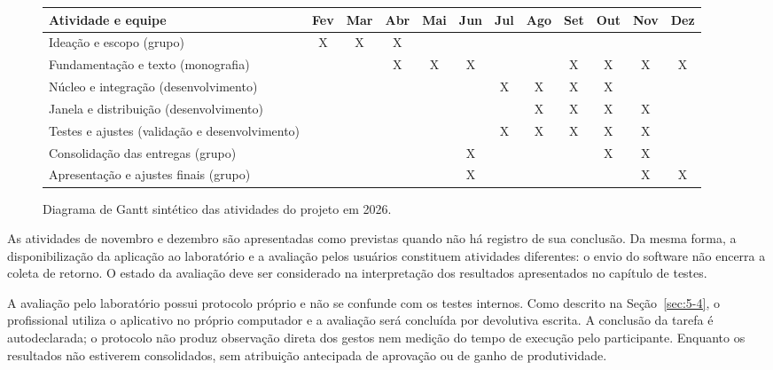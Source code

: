 \begin{figure}[htbp]
\centering
\caption{Diagrama de Gantt sintético das atividades do projeto em 2026.}
\label{fig:4-gantt}
\begingroup
\scriptsize
\setlength{\tabcolsep}{2pt}
\begin{tabularx}{\textwidth}{|X|*{11}{c|}}
\hline
\textbf{Atividade e equipe} & Fev & Mar & Abr & Mai & Jun & Jul & Ago & Set & Out & Nov & Dez \\ \hline
Ideação e escopo (grupo) & X & X & X & & & & & & & & \\ \hline
Fundamentação e texto (monografia) & & & X & X & X & & & X & X & X & X \\ \hline
Núcleo e integração (desenvolvimento) & & & & & & X & X & X & X & & \\ \hline
Janela e distribuição (desenvolvimento) & & & & & & & X & X & X & X & \\ \hline
Testes e ajustes (validação e desenvolvimento) & & & & & & X & X & X & X & X & \\ \hline
Consolidação das entregas (grupo) & & & & & X & & & & X & X & \\ \hline
Apresentação e ajustes finais (grupo) & & & & & X & & & & & X & X \\ \hline
\end{tabularx}
\endgroup
\par{}
\end{figure}

As atividades de novembro e dezembro são apresentadas como previstas quando não há registro de sua conclusão. Da mesma forma, a disponibilização da aplicação ao laboratório e a avaliação pelos usuários constituem atividades diferentes: o envio do software não encerra a coleta de retorno. O estado da avaliação deve ser considerado na interpretação dos resultados apresentados no capítulo de testes.

A avaliação pelo laboratório possui protocolo próprio e não se confunde com os testes internos. Como descrito na Seção~\ref{sec:5-4}, o profissional utiliza o aplicativo no próprio computador e a avaliação será concluída por devolutiva escrita. A conclusão da tarefa é autodeclarada; o protocolo não produz observação direta dos gestos nem medição do tempo de execução pelo participante. Enquanto os resultados não estiverem consolidados, sem atribuição antecipada de aprovação ou de ganho de produtividade.


